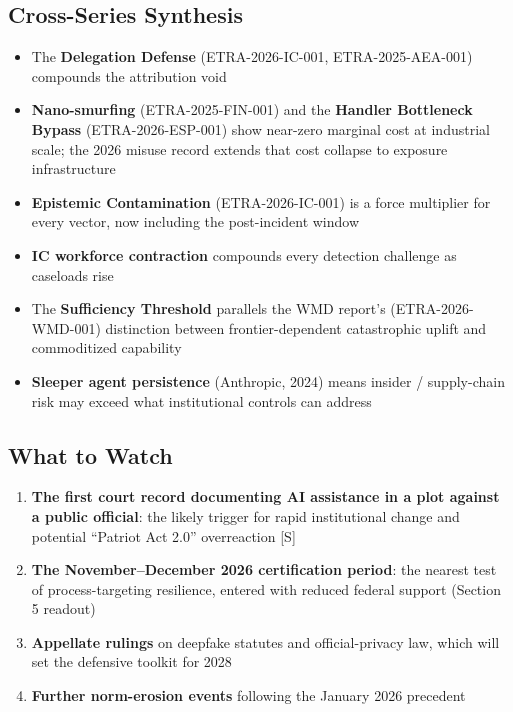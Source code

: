 \documentclass[11pt,letterpaper]{article}
\begin{document}
\subsection{Cross-Series Synthesis}

\begin{infobox}
\begin{itemize}
  \item The \textbf{Delegation Defense} (ETRA-2026-IC-001, ETRA-2025-AEA-001) compounds the attribution void
  \item \textbf{Nano-smurfing} (ETRA-2025-FIN-001) and the \textbf{Handler Bottleneck Bypass} (ETRA-2026-ESP-001) show near-zero marginal cost at industrial scale; the 2026 misuse record extends that cost collapse to exposure infrastructure
  \item \textbf{Epistemic Contamination} (ETRA-2026-IC-001) is a force multiplier for every vector, now including the post-incident window
  \item \textbf{IC workforce contraction} compounds every detection challenge as caseloads rise
  \item The \textbf{Sufficiency Threshold} parallels the WMD report's (ETRA-2026-WMD-001) distinction between frontier-dependent catastrophic uplift and commoditized capability
  \item \textbf{Sleeper agent persistence} (Anthropic, 2024) means insider / supply-chain risk may exceed what institutional controls can address
\end{itemize}
\end{infobox}

\subsection{What to Watch}

\begin{enumerate}
  \item \textbf{The first court record documenting AI assistance in a plot against a public official}: the likely trigger for rapid institutional change and potential ``Patriot Act 2.0'' overreaction [S]
  \item \textbf{The November--December 2026 certification period}: the nearest test of process-targeting resilience, entered with reduced federal support (Section 5 readout)
  \item \textbf{Appellate rulings} on deepfake statutes and official-privacy law, which will set the defensive toolkit for 2028
  \item \textbf{Further norm-erosion events} following the January 2026 precedent
\end{enumerate}
\end{document}
